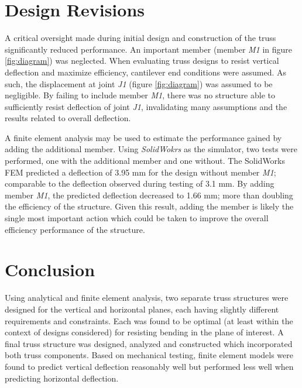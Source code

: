 \section{Design Revisions}
\label{sec:missingmember}



A critical oversight made during initial design and construction of the truss significantly reduced performance.
An important member (member \emph{M1} in figure \ref{fig:diagram}) was neglected.
%
When evaluating truss designs to resist vertical deflection and maximize efficiency, cantilever end conditions were assumed. 
As such, the displacement at joint \emph{J1} (figure \ref{fig:diagram}) was assumed to be negligible.
By failing to include member \emph{M1}, there was no structure able to sufficiently resist deflection of joint \emph{J1}, invalidating many assumptions and the results related to overall deflection.

A finite element analysis may be used to estimate the performance gained by adding the additional member. 
Using \emph{SolidWokrs} as the simulator, two tests were performed, one with the additional member and one without.
The SolidWorks FEM predicted a deflection of 3.95 mm for the design without member \emph{M1}; comparable to the deflection observed during testing of 3.1 mm. 
By adding member \emph{M1}, the predicted deflection decreased to 1.66 mm; more than doubling the efficiency of the structure.
Given this result, adding the member is likely the single most important action which could be taken to improve the overall efficiency performance of the structure.


\section{Conclusion}


Using analytical and finite element analysis, two separate truss structures were designed  for the vertical and horizontal planes, each having slightly different requirements and constraints.
Each was found to be optimal (at least within the context of designs considered) for resisting bending in the plane of interest. 
A final truss structure was designed, analyzed and constructed which incorporated both truss components. %
Based on mechanical testing, finite element models were found to predict vertical deflection reasonably well but performed less well when predicting horizontal deflection.

